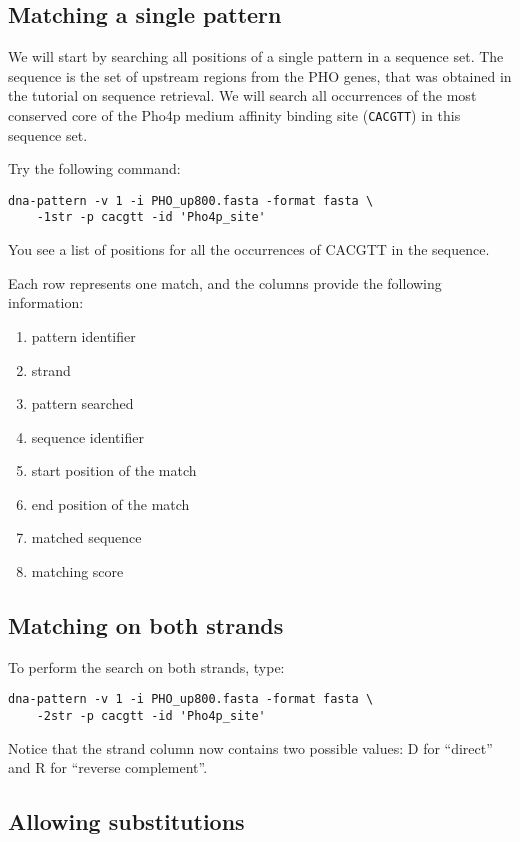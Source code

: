 \subsection{Matching a single pattern}

We will start by searching all positions of a single pattern in a
sequence set. The sequence is the set of upstream regions from the PHO
genes, that was obtained in the tutorial on sequence retrieval. We
will search all occurrences of the most conserved core of the Pho4p
medium affinity binding site (\texttt{CACGTT}) in this sequence set.

Try the following command:

\begin{verbatim}
dna-pattern -v 1 -i PHO_up800.fasta -format fasta \ 
    -1str -p cacgtt -id 'Pho4p_site'
\end{verbatim}

You see a list of positions for all the occurrences of CACGTT in the sequence.

Each row represents one match, and the columns provide the following
information:
\begin{enumerate}
\item pattern identifier
\item strand
\item pattern searched
\item sequence identifier
\item start position of the match
\item end position of the match
\item matched sequence
\item matching score
\end{enumerate}

\subsection{Matching on both strands}

To perform the search on both strands, type:
\begin{verbatim}
dna-pattern -v 1 -i PHO_up800.fasta -format fasta \ 
    -2str -p cacgtt -id 'Pho4p_site'
\end{verbatim}

Notice that the strand column now contains two possible values: D for
``direct'' and R for ``reverse complement''.

\subsection{Allowing substitutions}

